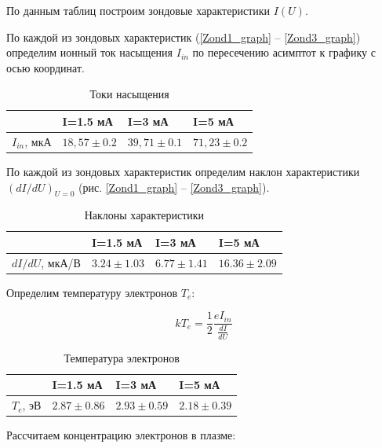 \documentclass[a4paper, 12pt]{article}
\begin{document}
По данным таблиц построим зондовые характеристики $I(U)$.

По каждой из зондовых характеристик (\ref{Zond1_graph} -- \ref{Zond3_graph}) определим ионный ток насыщения $I_{in}$ по пересечению асимптот к графику с осью координат.

\begin{table}[h]
\caption{Токи насыщения}
\begin{center}
\begin{tabular}{|l|l|l|l|}
\hline
    & I=1.5 мА & I=3 мА & I=5 мА \\ \hline
$I_{in}$, мкА & $18,57 \pm 0.2$  & $39,71 \pm 0.1$ & $71,23 \pm 0.2$  \\ \hline
\end{tabular}
\end{center}
\label{Iin}
\end{table}

По каждой из зондовых характеристик определим наклон характеристики $(dI/dU)_{U=0}$ (рис. \ref{Zond1_graph} -- \ref{Zond3_graph}).

\begin{table}[h]
\caption{Наклоны характеристики}
\begin{center}
\begin{tabular}{|l|l|l|l|}
\hline
    & I=1.5 мА & I=3 мА & I=5 мА \\ \hline
$dI/dU$, мкА/В & $3.24 \pm 1.03$  & $6.77 \pm 1.41$ & $16.36 \pm 2.09$  \\ \hline
\end{tabular}
\end{center}
\label{Iin}
\end{table}

Определим температуру электронов $T_e$:

\[kT_e = \frac{1}{2}\frac{eI_{in}}{\frac{dI}{dU}}\]

\begin{table}[h!]
\caption{Температура электронов}
\begin{center}
\begin{tabular}{|l|l|l|l|}
\hline
    & I=1.5 мА & I=3 мА & I=5 мА \\ \hline
$T_e$, эВ & $2.87 \pm 0.86$  & $2.93 \pm 0.59$ & $2.18 \pm 0.39$  \\ \hline
\end{tabular}
\end{center}
\label{Te}
\end{table}

Рассчитаем концентрацию электронов в плазме:
\end{document}
